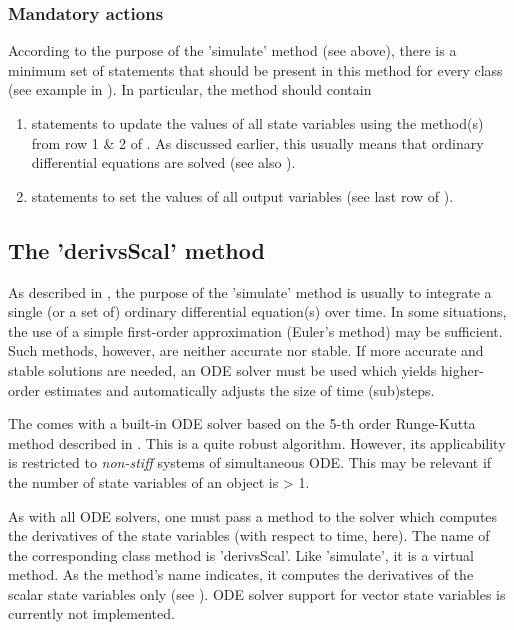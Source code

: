 \subsubsection*{Mandatory actions}
According to the purpose of the 'simulate' method (see above), there is a minimum set of statements that should be present in this method for every class (see example in ). In particular, the method should contain
\begin{enumerate}
  \item statements to update the values of all state variables using the method(s) from row 1 \& 2 of . As discussed earlier, this usually means that ordinary differential equations are solved (see also ).
  \item statements to set the values of all output variables (see last row of ).
\end{enumerate}

\subsection{The 'derivsScal' method} \label{sec:concept-classFeatures-derivsScal}
As described in , the purpose of the 'simulate' method is usually to integrate a single (or a set of) ordinary differential equation(s) over time. In some situations, the use of a simple first-order approximation (Euler's method) may be sufficient. Such methods, however, are neither accurate nor stable. If more accurate and stable solutions are needed, an ODE solver must be used which yields higher-order estimates and automatically adjusts the size of time (sub)steps.

The  comes with a built-in ODE solver based on the 5-th order Runge-Kutta method described in \citet{Press2002}. This is a quite robust algorithm. However, its applicability is restricted to \emph{non-stiff} systems of simultaneous ODE. This may be relevant if the number of state variables of an object is > 1.

As with all ODE solvers, one must pass a method to the solver which computes the derivatives of the state variables (with respect to time, here). The name of the corresponding class method is 'derivsScal'. Like 'simulate', it is a virtual method. As the method's name indicates, it computes the derivatives of the scalar state variables only (see ). ODE solver support for vector state variables is currently not implemented.


